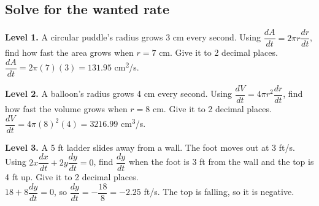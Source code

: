\documentclass[11pt]{article}
\begin{document}
\subsection*{Solve for the wanted rate}
\noindent\textbf{Level 1.} A circular puddle's radius grows 3 cm every second. Using $\dfrac{dA}{dt}=2\pi r\dfrac{dr}{dt}$, find how fast the area grows when $r=7$ cm. Give it to 2 decimal places.\\  \quad $\dfrac{dA}{dt}=2\pi(7)(3)=131.95$ cm\textsuperscript{2}/s.\par\medskip
\noindent\textbf{Level 2.} A balloon's radius grows 4 cm every second. Using $\dfrac{dV}{dt}=4\pi r^2\dfrac{dr}{dt}$, find how fast the volume grows when $r=8$ cm. Give it to 2 decimal places.\\  \quad $\dfrac{dV}{dt}=4\pi(8)^2(4)=3216.99$ cm\textsuperscript{3}/s.\par\medskip
\noindent\textbf{Level 3.} A 5 ft ladder slides away from a wall. The foot moves out at 3 ft/s. Using $2x\dfrac{dx}{dt}+2y\dfrac{dy}{dt}=0$, find $\dfrac{dy}{dt}$ when the foot is 3 ft from the wall and the top is 4 ft up. Give it to 2 decimal places.\\  \quad $18+8\dfrac{dy}{dt}=0$, so $\dfrac{dy}{dt}=-\dfrac{18}{8}=-2.25$ ft/s. The top is falling, so it is negative.\par\medskip
\end{document}
